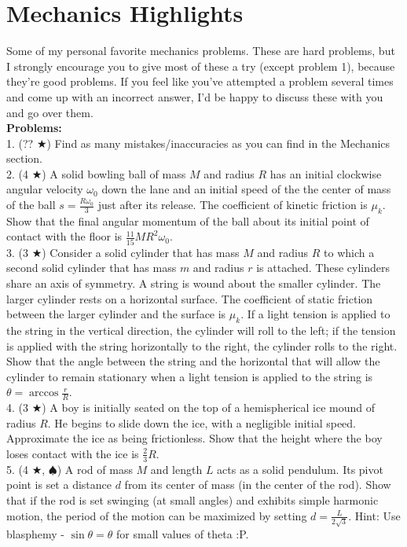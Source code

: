 \section*{Mechanics Highlights}
Some of my personal favorite mechanics problems. These are hard problems, but I strongly encourage you to give most of these a try (except problem 1), because they're good problems. If you feel like you've attempted a problem several times and come up with an incorrect answer, I'd be happy to discuss these with you and go over them. \\
\textbf{Problems:}\\
1. (?? $\bigstar$) Find as many mistakes/inaccuracies as you can find in the Mechanics section. \\
2. (4 $\bigstar$) A solid bowling ball of mass $M$ and radius $R$ has an initial clockwise angular velocity $\omega_0$ down the lane and an initial speed of the the center of mass of the ball $s = \frac{R\omega_0}{3}$ just after its release. The coefficient of kinetic friction is $\mu_k$. Show that the final angular momentum of the ball about its initial point of contact with the floor is $\frac{11}{15}MR^2 \omega_0$.\\
3. (3 $\bigstar$) Consider a solid cylinder that has mass $M$ and radius $R$ to which a second solid cylinder that has mass $m$ and radius $r$ is attached. These cylinders share an axis of symmetry. A string is wound about the smaller cylinder. The larger cylinder rests on a horizontal surface. The coefficient of static friction between the larger cylinder and the surface is $\mu_k$. If a light tension is applied to the string in the vertical direction, the cylinder will roll to the left; if the tension is applied with the string horizontally to the right, the cylinder rolls to the right. Show that the angle between the string and the horizontal that will allow the cylinder to remain stationary when a
light tension is applied to the string is $\theta = \arccos \frac{r}{R}$. \\
4. (3 $\bigstar$) A boy is initially seated on the top of a hemispherical ice mound of radius $R$. He begins to slide down the ice, with a negligible initial speed. Approximate the ice as being frictionless. Show that the height where the boy loses contact with the ice is $\frac{2}{3}R$. \\
5. (4 $\bigstar$, $\spadesuit$) A rod of mass $M$ and length $L$ acts as a solid pendulum. Its pivot point is set a distance $d$ from its center of mass (in the center of the rod). Show that if the rod is set swinging (at small angles) and exhibits simple harmonic motion, the period of the motion can be maximized by setting $d = \frac{L}{2\sqrt{3}}$. Hint: Use blasphemy - $\sin \theta = \theta$ for small values of theta :P. \\
